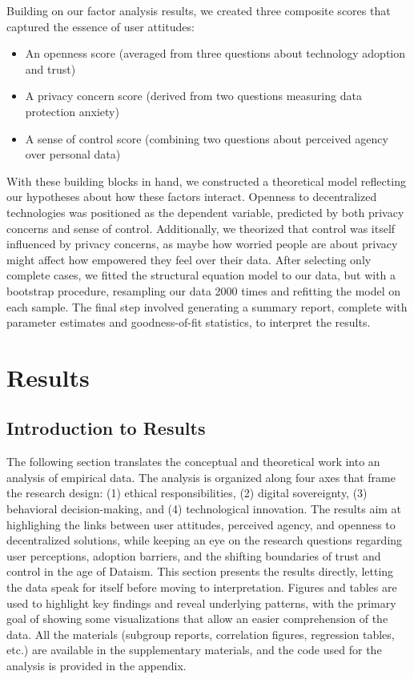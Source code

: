 	Building on our factor analysis results, we created three composite scores that captured the essence of user attitudes:
	\begin{itemize}
		\item An openness score (averaged from three questions about technology adoption and trust)
		\item A privacy concern score (derived from two questions measuring data protection anxiety)
		\item A sense of control score (combining two questions about perceived agency over personal data)
	\end{itemize}
	With these building blocks in hand, we constructed a theoretical model reflecting our hypotheses about how these factors interact. Openness to decentralized technologies was positioned as the dependent variable, predicted by both privacy concerns and sense of control. Additionally, we theorized that control was itself influenced by privacy concerns, as maybe how worried people are about privacy might affect how empowered they feel over their data.
	After selecting only complete cases, we fitted the structural equation model to our data, but with a bootstrap procedure, resampling our data 2000 times and refitting the model on each sample. The final step involved generating a summary report, complete with parameter estimates and goodness-of-fit statistics, to interpret the results.

\section{Results}
\subsection{Introduction to Results}
The following section translates the conceptual and theoretical work into an analysis of empirical data. The analysis is organized along four axes that frame the research design: (1) ethical responsibilities, (2) digital sovereignty, (3) behavioral decision-making, and (4) technological innovation. The results aim at highlighing the links between user attitudes, perceived agency, and openness to decentralized solutions, while keeping an eye on the research questions regarding user perceptions, adoption barriers, and the shifting boundaries of trust and control in the age of Dataism. This section presents the results directly, letting the data speak for itself before moving to interpretation. Figures and tables are used to highlight key findings and reveal underlying patterns, with the primary goal of showing some visualizations that allow an easier comprehension of the data. All the materials (subgroup reports, correlation figures, regression tables, etc.) are available in the supplementary materials, and the code used for the analysis is provided in the appendix.

